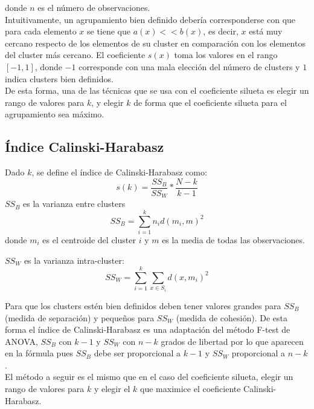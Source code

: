 donde $n$ es el número de observaciones. \\

Intuitivamente, un agrupamiento bien definido debería corresponderse con que para cada elemento $x$ se tiene que $a(x) << b(x)$, es decir, $x$ está muy cercano respecto de los elementos de su cluster en comparación con los elementos del cluster más cercano. El coeficiente $s(x)$ toma los valores en el rango $\left[ -1, 1\right]$, donde $-1$ corresponde con una mala elección del número de clusters y $1$ indica clusters bien definidos. \\

De esta forma, una de las técnicas que se usa con el coeficiente silueta es elegir un rango de valores para $k$, y elegir $k$ de forma que el coeficiente silueta para el agrupamiento sea máximo.

\subsection{Índice Calinski-Harabasz}
Dado $k$, se define el índice de Calinski-Harabasz como:
\begin{equation}
s(k) = \frac{SS_B}{SS_W} * \frac{N-k}{k-1} \nonumber
\end{equation}
$SS_B$ es la varianza entre clusters
\begin{equation}
SS_B = \sum_{i=1}^{k}n_id(m_i, m)^2 \nonumber
\end{equation}
donde $m_i$ es el centroide del cluster $i$ y $m$ es la media de todas las observaciones.

$SS_W$ es la varianza intra-cluster:
\begin{equation}
SS_W = \sum_{i=1}^{k}\sum_{x\in S_i}d(x, m_i)^2 \nonumber
\end{equation}

Para que los clusters estén bien definidos deben tener valores grandes para $SS_B$ (medida de separación) y peque\~nos para $SS_W$ (medida de cohesión). De esta forma el índice de Calinski-Harabasz es una adaptación del método F-test de ANOVA, $SS_B$ con $k-1$ y $SS_W$ con $n-k$ grados de libertad por lo que aparecen en la fórmula pues $SS_B$ debe ser proporcional a $k-1$ y $SS_W$ proporcional a $n-k$.  \\

El método a seguir es el mismo que en el caso del coeficiente silueta, elegir un rango de valores para $k$ y elegir el $k$ que maximice el coeficiente Calinski-Harabasz. \\

